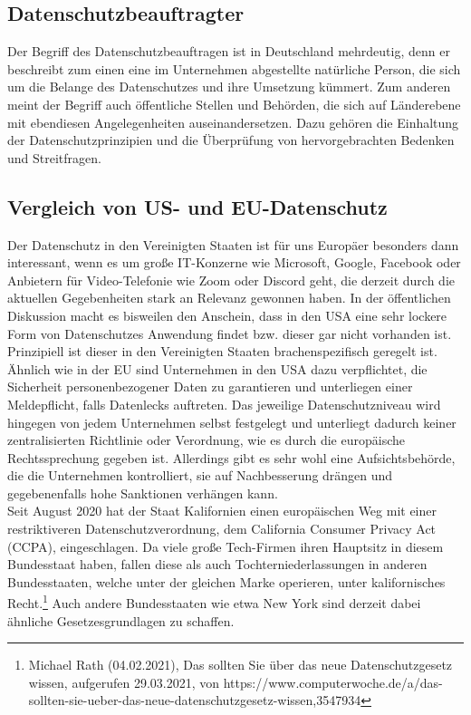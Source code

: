 \subsection{Datenschutzbeauftragter}
    Der Begriff des Datenschutzbeauftragen ist in Deutschland mehrdeutig, denn er beschreibt zum einen eine im Unternehmen abgestellte natürliche Person, die sich um die Belange des Datenschutzes und ihre Umsetzung kümmert. Zum anderen meint der Begriff auch öffentliche Stellen und Behörden, die sich auf Länderebene mit ebendiesen Angelegenheiten auseinandersetzen. Dazu gehören die Einhaltung der Datenschutzprinzipien und die Überprüfung von hervorgebrachten Bedenken und Streitfragen.

\subsection{Vergleich von US- und EU-Datenschutz}
    Der Datenschutz in den Vereinigten Staaten ist für uns Europäer besonders dann interessant, wenn es um große IT-Konzerne wie Microsoft, Google, Facebook oder Anbietern für Video-Telefonie wie Zoom oder Discord geht, die derzeit durch die aktuellen Gegebenheiten stark an Relevanz gewonnen haben. In der öffentlichen Diskussion macht es bisweilen den Anschein, dass in den USA eine sehr lockere Form von Datenschutzes Anwendung findet bzw. dieser gar nicht vorhanden ist. Prinzipiell ist dieser in den Vereinigten Staaten brachenspezifisch geregelt ist. Ähnlich wie in der EU sind Unternehmen in den USA dazu verpflichtet, die Sicherheit personenbezogener Daten zu garantieren und unterliegen einer Meldepflicht, falls Datenlecks auftreten. Das jeweilige Datenschutzniveau wird hingegen von jedem Unternehmen selbst festgelegt und unterliegt dadurch keiner zentralisierten Richtlinie oder Verordnung, wie es durch die europäische Rechtssprechung gegeben ist. Allerdings gibt es sehr wohl eine Aufsichtsbehörde, die die Unternehmen kontrolliert, sie auf Nachbesserung drängen und gegebenenfalls hohe Sanktionen verhängen kann.\\
    Seit August 2020 hat der Staat Kalifornien einen \glqq europäischen Weg\grqq{} mit einer restriktiveren Datenschutzverordnung, dem California Consumer Privacy Act (CCPA), eingeschlagen. Da viele große Tech-Firmen ihren Hauptsitz in diesem Bundesstaat haben, fallen diese als auch Tochterniederlassungen in anderen Bundesstaaten, welche unter der gleichen Marke operieren, unter kalifornisches Recht.\footnote{Michael Rath (04.02.2021), Das sollten Sie über das neue Datenschutzgesetz wissen, aufgerufen 29.03.2021, von https://www.computerwoche.de/a/das-sollten-sie-ueber-das-neue-datenschutzgesetz-wissen,3547934} Auch andere Bundesstaaten wie etwa New York sind derzeit dabei ähnliche Gesetzesgrundlagen zu schaffen.\\
